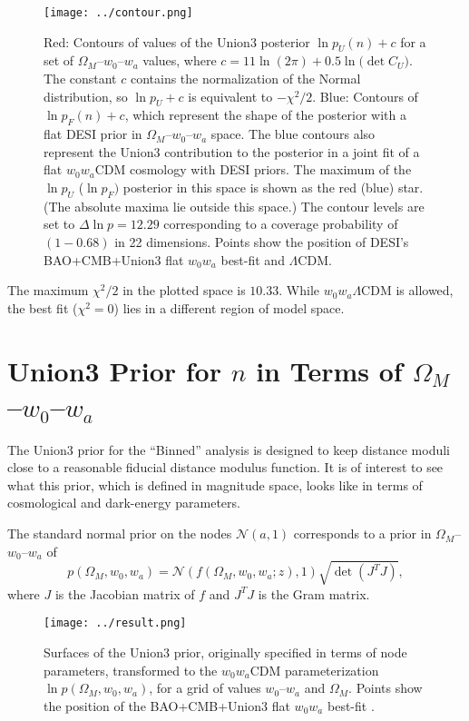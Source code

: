 \documentclass[11pt,a4paper]{article}
\begin{document}
\begin{figure}[htbp] %
   \centering
   \texttt{[image: ../contour.png]} 
   \caption{Red: Contours of values of the Union3 posterior $\ln{p_U}(n)+c$ for a
set of $\Omega_M$--$w_0$--$w_a$ values, where $c= 11\ln{(2\pi)} + 0.5\ln({\det{C_U})}$.  The constant $c$ contains the
normalization of the Normal distribution, so $\ln{p_U}+c$  is equivalent to  $-\chi^2/2$.   
   Blue: Contours of  $\ln{p_F}(n)  +c  $, which represent the shape of the posterior with a flat DESI prior in  $\Omega_M$--$w_0$--$w_a$ space.   
   The blue contours  also represent the Union3 contribution to the posterior in a joint fit of a flat $w_0w_a$CDM cosmology with DESI priors.
   The maximum of the $\ln{p}_U$  ($\ln{p}_F)$ posterior in this space is shown as the red (blue) star.  (The absolute maxima
   lie outside this space.)
   The contour levels are set to $\Delta \ln{p}=12.29$ corresponding to
   a coverage probability of $(1-0.68)$ in 22 dimensions. 
   Points show the position of DESI's  BAO+CMB+Union3 flat $w_0w_a$ best-fit 
    and  $\Lambda$CDM.}
   \label{fig:posterior}
\end{figure}

The maximum $\chi^2/2$ in the plotted space is $10.33$.  While $w_0w_a\Lambda$CDM is allowed, the best fit ($\chi^2=0$) lies in a
different region of model space. 

\section{Union3 Prior for $n$ in Terms of $\Omega_M$--$w_0$--$w_a$}
\label{sec:prior}
The Union3 prior for the ``Binned'' analysis is designed to keep distance moduli close to a reasonable
fiducial distance modulus function.  It is of interest to see what this prior, which is defined in magnitude
space, looks like in terms of cosmological and dark-energy parameters.

The standard normal prior on the nodes $\mathcal{N}(a,1)$ corresponds to a prior in  $\Omega_M$--$w_0$--$w_a$ of
\begin{equation}
p(\Omega_M, w_0,w_a) = \mathcal{N}(f(\Omega_M, w_0, w_a; z),1)  \sqrt{\det{\left(J^T J\right)}},
\end{equation}
where $J$ is the Jacobian matrix of $f$ and $J^TJ$ is the Gram matrix.

\begin{figure}[htbp] %
   \centering
   \texttt{[image: ../result.png]} 
   \caption{Surfaces of the Union3 prior, originally specified in terms of node parameters, transformed to the $w_0w_a$CDM parameterization
   $\ln{p}(\Omega_M, w_0,w_a)$,  for a grid of values
 $w_0$--$w_a$ and $\Omega_M$.   
   Points show the position of the BAO+CMB+Union3 flat $w_0w_a$ best-fit .}
   \label{fig:priors}
\end{figure}
\end{document}
